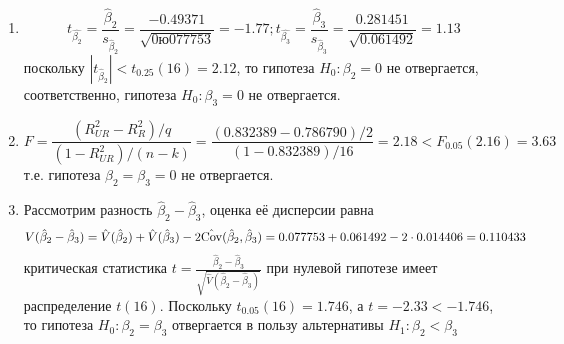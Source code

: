 \documentclass[pdftex,12pt,a4paper]{article}
\begin{document}
\begin{enumerate}
\begin{enumerate}
\item \begin{equation}
t_{\hat{\beta_2}}=\frac{\hat{\beta}_2}{s_{\hat{\beta}_2}}=\frac{-0.49371}{\sqrt{0ю077753}}=-1.77; t_{\hat{\beta_3}}=\frac{\hat{\beta}_3}{s_{\hat{\beta}_3}}=\frac{0.281451}{\sqrt{0.061492}}=1.13
\end{equation}
поскольку $|t_{\hat{\beta}_2}|<t_{0.25}(16)=2.12$, то гипотеза $H_0: \beta_2=0$ не отвергается, соответственно, гипотеза $H_0:\beta_3=0$ не отвергается.
\item \begin{equation}
F=\frac{(R_{UR}^2-R_R^2)/q}{(1-R_{UR}^2)/(n-k)}=\frac{(0.832389-0.786790)/2}{(1-0.832389)/16}=2.18<F_{0.05}(2.16)=3.63
\end{equation} т.е. гипотеза $\beta_2=\beta_3=0$ не отвергается.
\item Рассмотрим разность $\hat{\beta}_2-\hat{\beta}_3$, оценка её дисперсии равна \begin{equation}
{V}(\hat{\beta}_2-\hat{\beta}_3)=\hat{V}(\hat{\beta}_2)+\hat{V}(\hat{\beta}_3)-2\hat{\operatorname{Cov}}(\hat{\beta}_2,\hat{\beta}_3)=0.077753+0.061492-2\cdot 0.014406=0.110433
\end{equation} критическая статистика $t=\frac{\hat{\beta}_2-\hat{\beta}_3}{\sqrt{\hat{V}(\hat{\beta}_2-\hat{\beta}_3)}}$ при нулевой гипотезе имеет распределение $t(16)$. Поскольку $t_{0.05}(16)=1.746$, а $t=-2.33<-1.746$, то гипотеза $H_0: \beta_2=\beta_3$ отвергается в пользу альтернативы $H_1:\beta_2<\beta_3$
\end{enumerate}
\end{enumerate}
\end{document}
